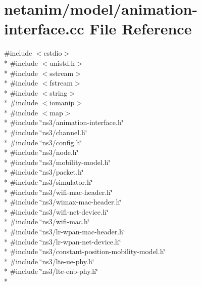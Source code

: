 \hypertarget{animation-interface_8cc}{}\section{netanim/model/animation-\/interface.cc File Reference}
\label{animation-interface_8cc}
{\ttfamily \#include $<$cstdio$>$}\\*
{\ttfamily \#include $<$unistd.\+h$>$}\\*
{\ttfamily \#include $<$sstream$>$}\\*
{\ttfamily \#include $<$fstream$>$}\\*
{\ttfamily \#include $<$string$>$}\\*
{\ttfamily \#include $<$iomanip$>$}\\*
{\ttfamily \#include $<$map$>$}\\*
{\ttfamily \#include \char`\"{}ns3/animation-\/interface.\+h\char`\"{}}\\*
{\ttfamily \#include \char`\"{}ns3/channel.\+h\char`\"{}}\\*
{\ttfamily \#include \char`\"{}ns3/config.\+h\char`\"{}}\\*
{\ttfamily \#include \char`\"{}ns3/node.\+h\char`\"{}}\\*
{\ttfamily \#include \char`\"{}ns3/mobility-\/model.\+h\char`\"{}}\\*
{\ttfamily \#include \char`\"{}ns3/packet.\+h\char`\"{}}\\*
{\ttfamily \#include \char`\"{}ns3/simulator.\+h\char`\"{}}\\*
{\ttfamily \#include \char`\"{}ns3/wifi-\/mac-\/header.\+h\char`\"{}}\\*
{\ttfamily \#include \char`\"{}ns3/wimax-\/mac-\/header.\+h\char`\"{}}\\*
{\ttfamily \#include \char`\"{}ns3/wifi-\/net-\/device.\+h\char`\"{}}\\*
{\ttfamily \#include \char`\"{}ns3/wifi-\/mac.\+h\char`\"{}}\\*
{\ttfamily \#include \char`\"{}ns3/lr-\/wpan-\/mac-\/header.\+h\char`\"{}}\\*
{\ttfamily \#include \char`\"{}ns3/lr-\/wpan-\/net-\/device.\+h\char`\"{}}\\*
{\ttfamily \#include \char`\"{}ns3/constant-\/position-\/mobility-\/model.\+h\char`\"{}}\\*
{\ttfamily \#include \char`\"{}ns3/lte-\/ue-\/phy.\+h\char`\"{}}\\*
{\ttfamily \#include \char`\"{}ns3/lte-\/enb-\/phy.\+h\char`\"{}}\\*

